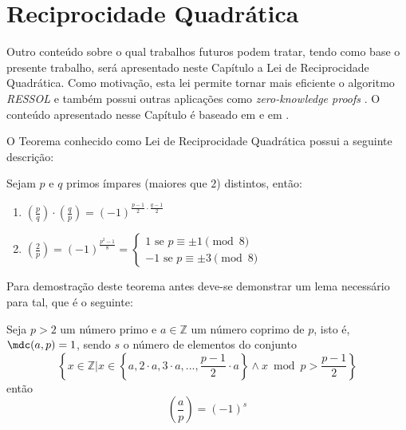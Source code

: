 \chapter{Reciprocidade Quadrática}
\label{cap:reciprocidadequadratica}

Outro conteúdo sobre o qual trabalhos futuros podem tratar, tendo como base o presente trabalho, será apresentado neste Capítulo a Lei de Reciprocidade Quadrática. Como motivação, esta lei permite tornar mais eficiente o algoritmo \textit{RESSOL} \cite{johndcookQuadraticReciprocity} e também possui outras aplicações como \textit{zero-knowledge proofs} \cite{Wright2016}. O conteúdo apresentado nesse Capítulo é baseado em \cite{book:2399854} e em \cite{youtuQuadraticReciprocity}.

O Teorema conhecido como Lei de Reciprocidade Quadrática possui a seguinte descrição:

\begin{teorema} Sejam $p$ e $q$ primos ímpares (maiores que $2$) distintos, então:
\label{teorema:reciprocidadequad}
    \begin{enumerate}
        \item \label{item:recipquad1} $\left(\frac{p}{q} \right) \cdot \left(\frac{q}{p} \right) = (-1)^{\frac{p-1}{2} \cdot \frac{q-1}{2}}$

        \item \label{item:recipquad2} $\left(\frac{2}{p} \right) = (-1)^{\frac{p^2 - 1}{8}} = \begin{cases}
                1 \text{ se $p \equiv \pm 1 \pmod{8}$}
                \\
                -1 \text{ se $p \equiv \pm 3 \pmod{8}$}
                \end{cases}$
    \end{enumerate}
    
\end{teorema}
Para demostração deste teorema antes deve-se demonstrar um lema necessário para tal, que é o seguinte:

\begin{lema} \label{lema:gauB}  Seja $p > 2$ um número primo e $a \in \mathbb{Z}$ um número coprimo de $p$, isto é, $\mdc(a, p) = 1$, sendo $s$ o número de elementos do conjunto
\begin{equation*}
    \left\{x \in \mathbb{Z} | x \in \left\{a, 2 \cdot a, 3 \cdot a, ..., \frac{p-1}{2} \cdot a\right\} \land x \bmod p > \frac{p-1}{2} \right\}
\end{equation*}
então
\begin{equation*}
    \left(\frac{a}{p}\right) = (-1)^s
\end{equation*}

\end{lema}

